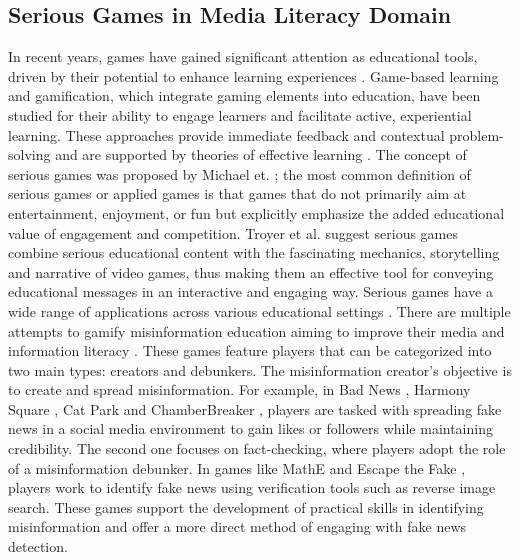 \subsection{Serious Games in Media Literacy Domain}
In recent years, games have gained significant attention as educational tools, driven by their potential to enhance learning experiences \cite{de2018games}. Game-based learning and gamification, which integrate gaming elements into education, have been studied for their ability to engage learners and facilitate active, experiential learning. These approaches provide immediate feedback and contextual problem-solving and are supported by theories of effective learning \cite{plass2015foundations, tobias2014game}. The concept of serious games was proposed by Michael et. \cite{michael2005serious}; the most common definition of serious games or applied games is that games that do not primarily aim at entertainment, enjoyment, or fun but explicitly emphasize the added educational value of engagement and competition. Troyer et al. \cite{de2017linking} suggest serious games combine serious educational content with the fascinating mechanics, storytelling and narrative of video games, thus making them an effective tool for conveying educational messages in an interactive and engaging way. Serious games have a wide range of applications across various educational settings \cite{connolly2012systematic, connolly2008development}. 
There are multiple attempts to gamify misinformation education aiming to improve their media and information literacy \cite{roozenbeek2019fake}.
These games feature players that can be categorized into two main types: creators and debunkers. The misinformation creator's objective is to create and spread misinformation. For example, in Bad News \cite{roozenbeek2019fake}, Harmony Square \cite{harmonysquare}, Cat Park \cite{Gusmanson.nl_2022} and ChamberBreaker \cite{jeon2021chamberbreaker}, players are tasked with spreading fake news in a social media environment to gain likes or followers while maintaining credibility. The second one focuses on fact-checking, where players adopt the role of a misinformation debunker. In games like MathE \cite{katsaounidou2019mathe} and Escape the Fake \cite{escapefake}, players work to identify fake news using verification tools such as reverse image search. These games support the development of practical skills in identifying misinformation and offer a more direct method of engaging with fake news detection.

